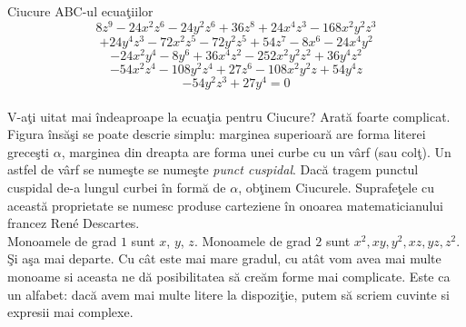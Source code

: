 \begin{surferPage}{Ciucure}
ABC-ul ecua\c tiilor 
  \smallskip
\[8z^9-24x^2z^6-24y^2z^6+36z^8+24x^4z^3-168x^2y^2z^3\]
\[+24y^4z^3-72x^2z^5-72y^2z^5+54z^7-8x^6-24x^4y^2\]
\[-24x^2y^4-8y^6 + 36x^4z^2-252x^2y^2z^2+36y^4z^2\]
\[- 54x^2z^4-108y^2z^4 + 27z^6-108x^2y^2z + 54y^4z\]
\[-54y^2z^3 + 27y^4 = 0\]\\
\vspace{0.3cm}
V-a\c ti uitat mai \^indeaproape la ecua\c tia pentru Ciucure? Arat\u a foarte complicat.
Figura \^ins\u a\c si se poate descrie simplu: marginea superioar\u a are forma literei grece\c sti  $\alpha$, marginea din dreapta are forma 
unei curbe cu un v\^arf (sau col\c t). Un astfel de v\^arf se nume\c ste se nume\c ste {\it punct cuspidal}. Dac\u a tragem punctul cuspidal de-a lungul
curbei \^in form\u a de   $\alpha$, ob\c tinem Ciucurele.
Suprafe\c tele cu aceast\u a proprietate se numesc produse carteziene \^in onoarea matematicianului francez  Ren\'e Descartes.
\\
\vspace{0.3cm}
Monoamele de grad $1$ sunt $x$, $y$, $z$. Monoamele de grad $2$ sunt $x^2, xy, y^2, xz, yz, z^2$. \c Si a\c sa mai departe.
Cu c\^at este mai mare gradul, cu at\^at vom avea mai multe monoame si aceasta ne d\u a posibilitatea s\u a cre\u am forme mai complicate.
Este ca un alfabet: dac\u a avem mai multe litere la dispozi\c tie, putem s\u a scriem cuvinte si expresii mai complexe.

\end{surferPage}